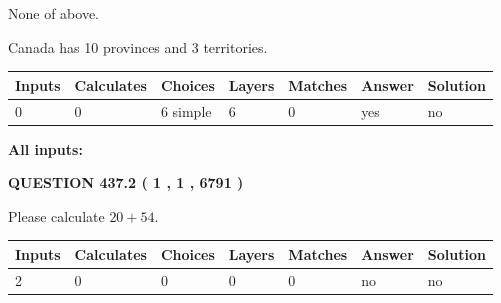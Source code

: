 \documentclass[12pt]{article}
\begin{document}
 
 None of above.
 
 
\noindent{}
 
 
Canada has 10  provinces and 3 territories.
 
 
\noindent{}
 
 
   
   
   
   
\noindent\begin{tabular}{|l|l|l|l|l|l|l|}
 \hline
Inputs & Calculates & Choices & Layers & Matches & Answer & Solution \\ \hline
 0  & 
 0  & 
 6
  simple  
  & 
 6  & 
 0  & 
  yes & 
  no 
  \\ \hline
 \end{tabular}
   
   
   
   
\noindent{}
   
   
   
   
\noindent\vspace{0.1in}\hspace{-0.08in} {\textbf{\Large{All inputs: }}}
   
   
  
\vspace{0.2in}
  
{\textbf{\Large{QUESTION
437.2 
 ( 1 , 1 , 6791 )
}}}
  
  
 
Please calculate $ %
20 +  %
54 $.
 
 
   
   
   
   
\noindent\begin{tabular}{|l|l|l|l|l|l|l|}
 \hline
Inputs & Calculates & Choices & Layers & Matches & Answer & Solution \\ \hline
 2  & 
 0  & 
 0
  & 
 0  & 
 0  & 
  no & 
  no 
  \\ \hline
 \end{tabular}
   
   
   
   
\noindent{}
   
\end{document}

